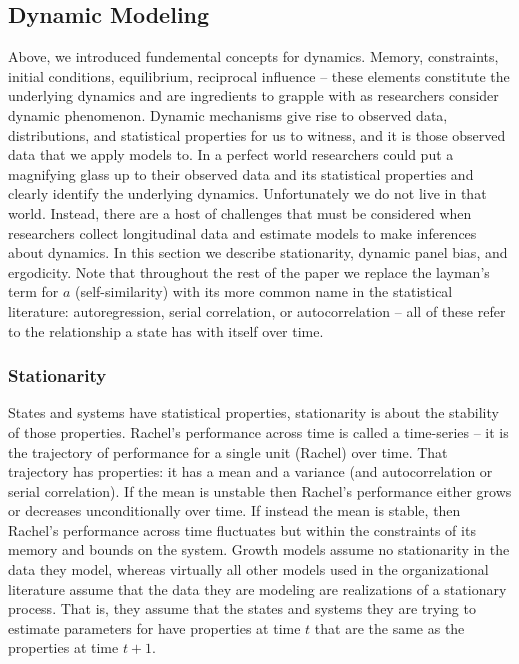 \documentclass[english,,man]{apa6}
\theoremstyle{definition}
\theoremstyle{definition}
\theoremstyle{definition}
\theoremstyle{remark}
\begin{document}
\hypertarget{dynamic-modeling}{%
\subsection{Dynamic Modeling}\label{dynamic-modeling}}

Above, we introduced fundemental concepts for dynamics. Memory,
constraints, initial conditions, equilibrium, reciprocal influence --
these elements constitute the underlying dynamics and are ingredients to
grapple with as researchers consider dynamic phenomenon. Dynamic
mechanisms give rise to observed data, distributions, and statistical
properties for us to witness, and it is those observed data that we
apply models to. In a perfect world researchers could put a magnifying
glass up to their observed data and its statistical properties and
clearly identify the underlying dynamics. Unfortunately we do not live
in that world. Instead, there are a host of challenges that must be
considered when researchers collect longitudinal data and estimate
models to make inferences about dynamics. In this section we describe
stationarity, dynamic panel bias, and ergodicity. Note that throughout
the rest of the paper we replace the layman's term for \(a\)
(self-similarity) with its more common name in the statistical
literature: autoregression, serial correlation, or autocorrelation --
all of these refer to the relationship a state has with itself over
time.

\hypertarget{stationarity}{%
\subsubsection{Stationarity}\label{stationarity}}

States and systems have statistical properties, stationarity is about
the stability of those properties. Rachel's performance across time is
called a time-series -- it is the trajectory of performance for a single
unit (Rachel) over time. That trajectory has properties: it has a mean
and a variance (and autocorrelation or serial correlation). If the mean
is unstable then Rachel's performance either grows or decreases
unconditionally over time. If instead the mean is stable, then Rachel's
performance across time fluctuates but within the constraints of its
memory and bounds on the system. Growth models assume no stationarity in
the data they model, whereas virtually all other models used in the
organizational literature assume that the data they are modeling are
realizations of a stationary process. That is, they assume that the
states and systems they are trying to estimate parameters for have
properties at time \(t\) that are the same as the properties at time
\(t + 1\).
\end{document}
